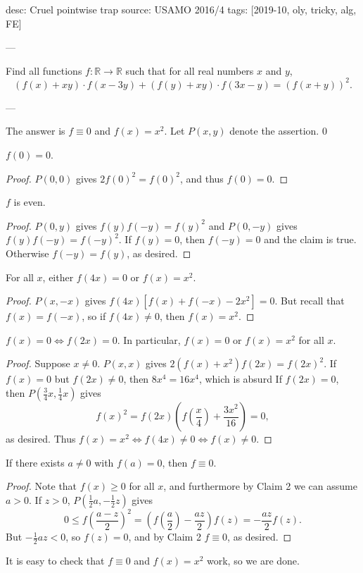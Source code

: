 desc: Cruel pointwise trap
source: USAMO 2016/4
tags: [2019-10, oly, tricky, alg, FE]

---

Find all functions $f:\mathbb R\to\mathbb R$ such that for all real numbers $x$ and $y$, \[(f(x)+xy)\cdot f(x-3y)+(f(y)+xy)\cdot f(3x-y)=(f(x+y))^2.\]

---

The answer is $f\equiv0$ and $f(x)=x^2$.  Let $P(x,y)$ denote the assertion.
\setcounter{iclaim}0
\begin{iclaim}
    $f(0)=0$.
\end{iclaim}
\begin{proof}
    $P(0,0)$ gives $2f(0)^2=f(0)^2$, and thus $f(0)=0$.
\end{proof}
\begin{iclaim}
    $f$ is even.
\end{iclaim}
\begin{proof}
    $P(0,y)$ gives $f(y)f(-y)=f(y)^2$ and $P(0,-y)$ gives $f(y)f(-y)=f(-y)^2$. If $f(y)=0$, then $f(-y)=0$ and the claim is true. Otherwise $f(-y)=f(y)$, as desired.
\end{proof}
\begin{iclaim}
    For all $x$, either $f(4x)=0$ or $f(x)=x^2$.
\end{iclaim}
\begin{proof}
    $P(x,-x)$ gives $f(4x)\left[f(x)+f(-x)-2x^2\right]=0$. But recall that $f(x)=f(-x)$, so if $f(4x)\ne0$, then $f(x)=x^2$.
\end{proof}
\begin{iclaim}
    $f(x)=0\iff f(2x)=0$. In particular, $f(x)=0$ or $f(x)=x^2$ for all $x$.
\end{iclaim}
\begin{proof}
    Suppose $x\ne0$. $P(x,x)$ gives $2\left(f(x)+x^2\right)f(2x)=f(2x)^2$. If $f(x)=0$ but $f(2x)\ne0$, then $8x^4=16x^4$, which is absurd If $f(2x)=0$, then $P(\tfrac34x,\tfrac14x)$ gives \[f(x)^2=f(2x)\left(f\left(\frac x4\right)+\frac{3x^2}{16}\right)=0,\]
    as desired. Thus $f(x)=x^2\iff f(4x)\ne0\iff f(x)\ne0$.
\end{proof}
\begin{iclaim}
    If there exists $a\ne0$ with $f(a)=0$, then $f\equiv0$.
\end{iclaim}
\begin{proof}
    Note that $f(x)\ge0$ for all $x$, and furthermore by Claim 2 we can assume $a>0$. If $z>0$, $P(\tfrac12a,-\tfrac12z)$ gives \[0\le f\left(\frac{a-z}2\right)^2=\left(f\left(\frac a2\right)-\frac{az}2\right)f(z)=-\frac{az}2f(z).\]
    But $-\tfrac12az<0$, so $f(z)=0$, and by Claim 2 $f\equiv0$, as desired.
\end{proof}

It is easy to check that $f\equiv0$ and $f(x)=x^2$ work, so we are done.
